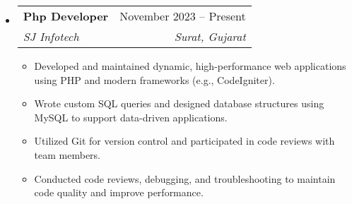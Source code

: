 \documentclass[letterpaper,11pt]{article}
\makeatletter
\newcommand{\resumeItem}[1]{
  \item\small{
    {#1 \vspace{-4pt}}
  }
}
\newcommand{\resumeSubheading}[4]{
  \vspace{-2pt}\item
    \begin{tabular*}{0.97\textwidth}[t]{l@{\extracolsep{\fill}}r}
      \textbf{#1} & #2 \\
      \textit{\small#3} & \textit{\small #4} \\
    \end{tabular*}\vspace{-7pt}
}
\newcommand{\resumeSubSubheading}[2]{
    \item
    \begin{tabular*}{0.97\textwidth}{l@{\extracolsep{\fill}}r}
      \textit{\small#1} & \textit{\small #2} \\
    \end{tabular*}\vspace{-7pt}
}
\newcommand{\resumeSubHeadingListStart}{\begin{itemize}[leftmargin=0.05in, label={}]}
\newcommand{\resumeSubHeadingListEnd}{\end{itemize}}
\newcommand{\resumeItemListStart}{\begin{itemize}\vspace{2pt}}
\newcommand{\resumeItemListEnd}{\end{itemize}\vspace{-5pt}}
\makeatother
\begin{document}
    \resumeSubHeadingListStart

    \resumeSubheading
      {Php Developer}{November 2023 -- Present }
      {SJ Infotech}{Surat, Gujarat }
      \resumeItemListStart
        \resumeItem{Developed and maintained dynamic, high-performance web applications using PHP and modern frameworks (e.g., CodeIgniter).}
        \resumeItem{Wrote custom SQL queries and designed database structures using MySQL to support data-driven applications.}
        \resumeItem{ Utilized Git for version control and participated in code reviews with team members.}
         \resumeItem{Conducted code reviews, debugging, and troubleshooting to maintain code quality and improve performance.}
      \resumeItemListEnd
    \resumeSubHeadingListEnd
      

\end{document}

